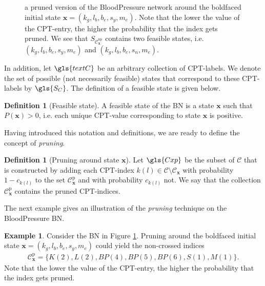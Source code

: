 \documentclass[a4paper, twoside, 11pt]{report}
\newcommand{\bfx}{{\mathbf{x}}}
\newcommand{\C}{{\mathcal C}}
\theoremstyle{plain}
\theoremstyle{definition}
\newtheorem{definition}[thm]{Definition}
\newtheorem{example}[thm]{Example}
\theoremstyle{remark}
\begin{document}
\begin{figure}[t!]
\begin{adjustbox}{width=\textwidth}
\end{adjustbox}
\caption{a pruned version of the BloodPressure network around the boldfaced initial state $\bfx = (k_g, l_b, b_e, s_y, m_e)$. Note that the lower the value of the CPT-entry, the higher the probability that the index gets pruned. We see that $S_{\C_\bfx^{\text{np}}}$ contains two feasible states, i.e. $(k_g, l_b, b_e, s_y, m_e)$ and $(k_g, l_b, b_e, s_n, m_e)$.}
\label{pruning}
\end{figure}
In addition, let $\gls{textC}$ be an arbitrary collection of CPT-labels. We denote the set of possible (not necessarily feasible) states that correspond to these CPT-labels by $\gls{S_C}$. The definition of a feasible state is given below.
\begin{definition}[Feasible state]
A feasible state of the BN is a state $\bfx$ such that $P(\bfx)>0$, i.e. each unique CPT-value corresponding to state $\bfx$ is positive.
\end{definition}
Having introduced this notation and definitions, we are ready to define the concept of \textit{pruning}.
\begin{definition}[Pruning around state $\bfx$]\label{prunedef}
Let $\gls{Cxp}$ be the subset of $\C$ that is constructed by adding each CPT-index $k(l) \in \C \setminus \C_{\bfx}$ with probability $1-c_{k(l)}$ to the set $\C_\bfx^{\text{p}}$ and with probability $c_{k(l)}$ not. We say that the collection $\C_\bfx^{\text{p}}$ contains the pruned CPT-indices. 
\end{definition}
The next example gives an illustration of the \textit{pruning} technique on the BloodPressure BN.
\begin{example}\label{ex:pruning}
Consider the BN in Figure \ref{pruning}. Pruning around the boldfaced initial state $\bfx = (k_g, l_b, b_e, s_y, m_e)$ could yield the non-crossed indices 
\begin{align*}
\C_\bfx^{\text{p}} = \{ K(2), L(2), BP(4), BP(5), BP(6), S(1), M(1) \}.
\end{align*}
Note that the lower the value of the CPT-entry, the higher the probability that the index gets pruned. 
\end{example}
\end{document}
